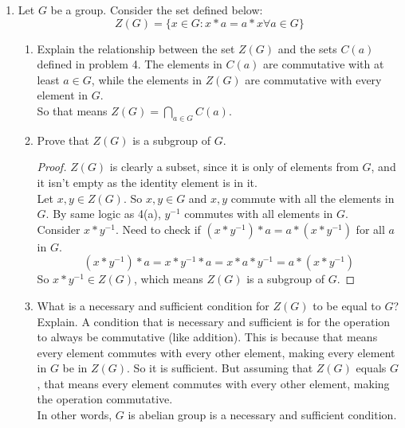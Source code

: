 \documentclass[12pt]{article}
\begin{document}
\begin{enumerate}
		\item Let $G$ be a group. Consider the set defined below: 
		\[Z(G) = \{x \in G : x*a = a * x \forall a \in G\}\]
		\begin{enumerate}
			\item Explain the relationship between the set $Z(G)$ and the sets $C(a)$ defined in problem 4.\m
			The elements in $C(a)$ are commutative with at least $a \in G$, while the elements in $Z(G)$ are commutative with every element in $G$.\\
			So that means $Z(G) = \bigcap_{a \in G} C(a)$.
			\item Prove that $Z(G)$ is a subgroup of $G$.
			\begin{proof}
				$Z(G)$ is clearly a subset, since it is only of elements from $G$, and it isn't empty as the identity element is in it.\\
				Let $x,y \in Z(G)$. So $x,y \in G$ and $x,y$ commute with all the elements in $G$. By same logic as 4(a), $y^{-1}$ commutes with all elements in $G$.\\
				Consider $x*y^{-1}$. Need to check if $(x*y^{-1})*a = a*(x*y^{-1})$ for all $a$ in $G$.\\
				\[(x*y^{-1})*a = x*y^{-1}*a = x*a*y^{-1} = a*(x*y^{-1})\]
				So $x*y^{-1} \in Z(G)$, which means $Z(G)$ is a subgroup of $G$.
			\end{proof}
			\item What is a necessary and sufficient condition for $Z(G)$ to be equal to $G$? Explain.\m
			A condition that is necessary and sufficient is for the operation to always be commutative (like addition). This is because that means every element commutes with every other element, making every element in $G$ be in $Z(G)$. So it is sufficient. But assuming that $Z(G)$ equals $G$, that means every element commutes with every other element, making the operation commutative.\\
			In other words, $G$ is abelian group is a necessary and sufficient condition.
		\end{enumerate}
	

\end{enumerate}
\end{document}
